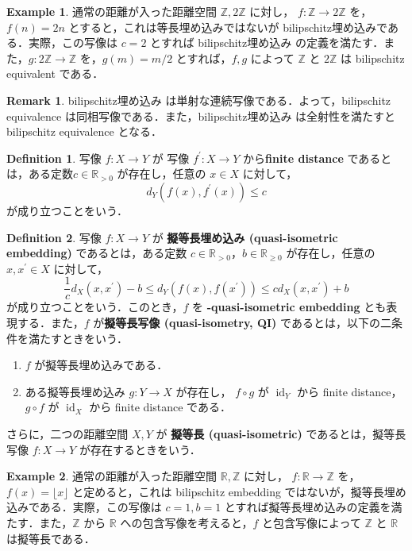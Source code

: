 \documentclass[dvipdfmx]{ujarticle}
\DeclareMathOperator{\id}{id}
\theoremstyle{definition}
\newtheorem{dfn}{Definition}[section]
\newtheorem*{rem*}{Remark}
\newtheorem*{ex*}{Example}
\begin{document}
\begin{ex*}
通常の距離が入った距離空間 $\mathbb{Z},2\mathbb{Z}$ に対し， $f\colon\mathbb{Z}\rightarrow 2\mathbb{Z}$ を，$f(n)=2n$ とすると，これは等長埋め込みではないが bilipschitz埋め込みである．実際，この写像は $c=2$ とすれば bilipschitz埋め込み の定義を満たす．また，$g\colon2\mathbb{Z}\rightarrow \mathbb{Z}$ を，$g(m)=m/2$ とすれば，$f,g$ によって $\mathbb{Z}$ と $2\mathbb{Z}$ は bilipschitz equivalent である．
\end{ex*}

\begin{rem*}
bilipschitz埋め込み は単射な連続写像である．よって，bilipschitz equivalence は同相写像である．また，bilipschitz埋め込み は全射性を満たすと bilipschitz equivalence となる．
\end{rem*}

\begin{dfn}
写像 $f\colon X\rightarrow Y$ が 写像 $f^\prime\colon X\rightarrow Y$ から\textbf{finite distance} であるとは，ある定数$c\in\mathbb{R}_{>0}$ が存在し，任意の $x\in X$ に対して，
 $$d_Y(f(x),f^\prime(x))\leq c$$
が成り立つことをいう．
\end{dfn}

\begin{dfn}\label{QI}
写像 $f\colon X\rightarrow Y$ が \textbf{擬等長埋め込み (quasi-isometric embedding)} であるとは，ある定数 $c\in\mathbb{R}_{>0}$，$b\in\mathbb{R}_{\geq0}$ が存在し，任意の $x,x^\prime\in X$ に対して，
 $$\frac{1}{c}d_X(x,x^\prime)-b\leq d_Y(f(x),f(x^\prime))\leq cd_X(x,x^\prime)+b$$
 が成り立つことをいう．このとき，$f$ を \textbf{-quasi-isometric embedding} とも表現する．また，$f$ が\textbf{擬等長写像 (quasi-isometry, QI)} であるとは，以下の二条件を満たすときをいう．
 \begin{enumerate}
  \item $f$ が擬等長埋め込みである．
  \item ある擬等長埋め込み $g\colon Y\rightarrow X$ が存在し，
  $f\circ g$ が $\id_Y$ から finite distance，$g\circ f$ が $\id_X$ から finite distance である．
 \end{enumerate}
さらに，二つの距離空間 $X,Y$ が \textbf{擬等長 (quasi-isometric)} であるとは，擬等長写像 $f\colon X\rightarrow Y$ が存在するときをいう．
\end{dfn}

\begin{ex*}
通常の距離が入った距離空間 $\mathbb{R},\mathbb{Z}$ に対し， $f\colon\mathbb{R}\rightarrow\mathbb{Z}$ を，$f(x)=\lfloor x \rfloor$ と定めると，これは bilipschitz embedding ではないが，擬等長埋め込みである．実際，この写像は $c=1,b=1$ とすれば擬等長埋め込みの定義を満たす．また，$\mathbb{Z}$ から $\mathbb{R}$ への包含写像を考えると，$f$ と包含写像によって $\mathbb{Z}$ と $\mathbb{R}$ は擬等長である．
\end{ex*}
\end{document}
